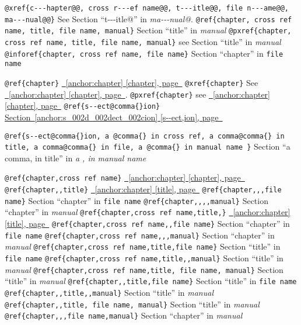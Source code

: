\documentclass{book}
\begin{document}
\texttt{@xref\{c{-}{-}{-}hapter@@, cross r{-}{-}{-}ef name@@, t{-}{-}{-}itle@@, file n{-}{-}{-}ame@@, ma{-}{-}{-}nual@@\}} See Section ``t{-}{-}{-}itle@'' in \textsl{ma{-}{-}{-}nual@}.
\texttt{@ref\{chapter, cross ref name, title, file name, manual\}} Section ``title'' in \textsl{manual}
\texttt{@pxref\{chapter, cross ref name, title, file name, manual\}} see Section ``title'' in \textsl{manual}
\texttt{@inforef\{chapter, cross ref name, file name\}} Section ``chapter'' in \texttt{file name}

\texttt{@ref\{chapter\}} \hyperref[anchor:chapter]{\chaptername~\ref*{anchor:chapter} [chapter], page~\pageref*{anchor:chapter}}
\texttt{@xref\{chapter\}} See \hyperref[anchor:chapter]{\chaptername~\ref*{anchor:chapter} [chapter], page~\pageref*{anchor:chapter}}.
\texttt{@pxref\{chapter\}} see \hyperref[anchor:chapter]{\chaptername~\ref*{anchor:chapter} [chapter], page~\pageref*{anchor:chapter}}
\texttt{@ref\{s{-}{-}ect@comma\{\}ion\}} \hyperref[anchor:s_002d_002dect_002cion]{Section~\ref*{anchor:s_002d_002dect_002cion} [s{-}{-}ect,ion], page~\pageref*{anchor:s_002d_002dect_002cion}}

\texttt{@ref\{s{-}{-}ect@comma\{\}ion, a @comma\{\} in cross
ref, a comma@comma\{\} in title, a comma@comma\{\} in file, a @comma\{\} in manual name \}}
Section ``a comma, in title'' in \textsl{a , in manual name}

\texttt{@ref\{chapter,cross ref name\}} \hyperref[anchor:chapter]{\chaptername~\ref*{anchor:chapter} [chapter], page~\pageref*{anchor:chapter}}
\texttt{@ref\{chapter,,title\}} \hyperref[anchor:chapter]{\chaptername~\ref*{anchor:chapter} [title], page~\pageref*{anchor:chapter}}
\texttt{@ref\{chapter,,,file name\}} Section ``chapter'' in \texttt{file name}
\texttt{@ref\{chapter,,,,manual\}} Section ``chapter'' in \textsl{manual}
\texttt{@ref\{chapter,cross ref name,title,\}} \hyperref[anchor:chapter]{\chaptername~\ref*{anchor:chapter} [title], page~\pageref*{anchor:chapter}}
\texttt{@ref\{chapter,cross ref name,,file name\}} Section ``chapter'' in \texttt{file name}
\texttt{@ref\{chapter,cross ref name,,,manual\}} Section ``chapter'' in \textsl{manual}
\texttt{@ref\{chapter,cross ref name,title,file name\}} Section ``title'' in \texttt{file name}
\texttt{@ref\{chapter,cross ref name,title,,manual\}} Section ``title'' in \textsl{manual}
\texttt{@ref\{chapter,cross ref name,title, file name, manual\}} Section ``title'' in \textsl{manual}
\texttt{@ref\{chapter,,title,file name\}} Section ``title'' in \texttt{file name}
\texttt{@ref\{chapter,,title,,manual\}} Section ``title'' in \textsl{manual}
\texttt{@ref\{chapter,,title, file name, manual\}} Section ``title'' in \textsl{manual}
\texttt{@ref\{chapter,,,file name,manual\}} Section ``chapter'' in \textsl{manual}
\end{document}
